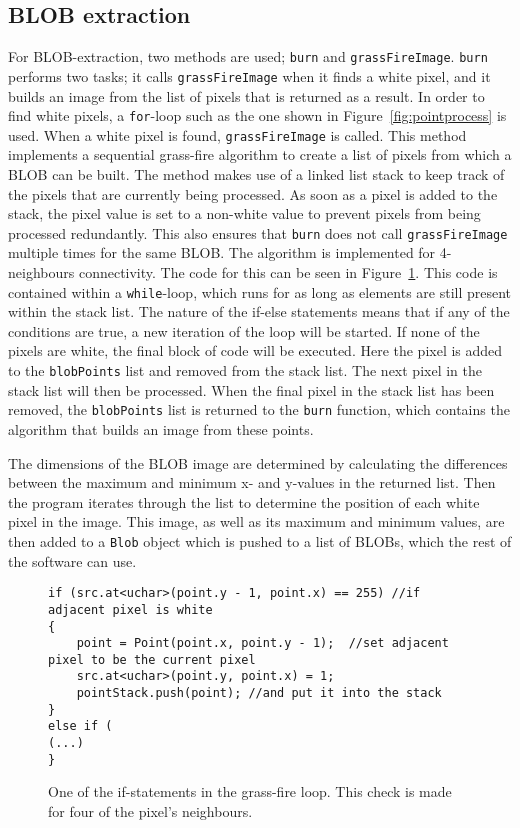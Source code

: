 \subsection{BLOB extraction}
For BLOB-extraction, two methods are used; \texttt{burn} and \texttt{grassFireImage}. \texttt{burn} performs two tasks; it calls \texttt{grassFireImage} when it finds a white pixel, and it builds an image from the list of pixels that is returned as a result. In order to find white pixels, a \texttt{for}-loop such as the one shown in Figure~\ref{fig:pointprocess} is used. When a white pixel is found, \texttt{grassFireImage} is called. This method implements a sequential grass-fire algorithm to create a list of pixels from which a BLOB can be built. The method makes use of a linked list stack to keep track of the pixels that are currently being processed. As soon as a pixel is added to the stack, the pixel value is set to a non-white value to prevent pixels from being processed redundantly. This also ensures that \texttt{burn} does not call \texttt{grassFireImage} multiple times for the same BLOB. The algorithm is implemented for 4-neighbours connectivity. The code for this can be seen in Figure~\ref{fig:grassFireIf}. This code is contained within a \texttt{while}-loop, which runs for as long as elements are still present within the stack list. The nature of the if-else statements means that if any of the conditions are true, a new iteration of the loop will be started. If none of the pixels are white, the final block of code will be executed. Here the pixel is added to the \texttt{blobPoints} list and removed from the stack list. The next pixel in the stack list will then be processed. When the final pixel in the stack list has been removed, the \texttt{blobPoints} list is returned to the \texttt{burn} function, which contains the algorithm that builds an image from these points.

The dimensions of the BLOB image are determined by calculating the differences between the maximum and minimum x- and y-values in the returned list. Then the program iterates through the list to determine the position of each white pixel in the image. This image, as well as its maximum and minimum values, are then added to a \texttt{Blob} object which is pushed to a list of BLOBs, which the rest of the software can use.  

\begin{figure}
\begin{lstlisting}
if (src.at<uchar>(point.y - 1, point.x) == 255) //if adjacent pixel is white 
{
	point = Point(point.x, point.y - 1);  //set adjacent pixel to be the current pixel
	src.at<uchar>(point.y, point.x) = 1;
	pointStack.push(point); //and put it into the stack
}
else if (
(...)
}
\end{lstlisting}
\caption{One of the if-statements in the grass-fire loop. This check is made for four of the pixel's neighbours. \label{fig:grassFireIf}}
\end{figure}

